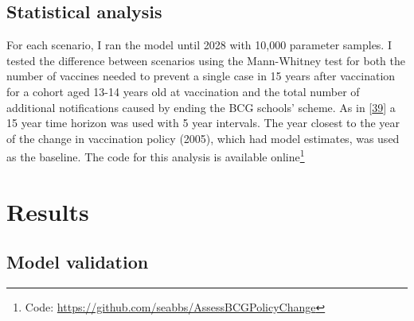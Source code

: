 \documentclass[11pt,twoside]{bristolthesis}
\begin{document}
  \hypertarget{statistical-analysis}{%
  \subsection{Statistical analysis}\label{statistical-analysis}}
  
  For each scenario, I ran the model until 2028 with 10,000 parameter samples. I tested the difference between scenarios using the Mann-Whitney test for both the number of vaccines needed to prevent a single case in 15 years after vaccination for a cohort aged 13-14 years old at vaccination and the total number of additional notifications caused by ending the BCG schools' scheme. As in {[}\protect\hyperlink{ref-Sutherland1989}{39}{]} a 15 year time horizon was used with 5 year intervals. The year closest to the year of the change in vaccination policy (2005), which had model estimates, was used as the baseline. The code for this analysis is available online\footnote{Code: \url{https://github.com/seabbs/AssessBCGPolicyChange}}
  
  \hypertarget{results}{%
  \section{Results}\label{results}}
  
  \hypertarget{model-validation}{%
  \subsection{Model validation}\label{model-validation}}
  
\end{document}
